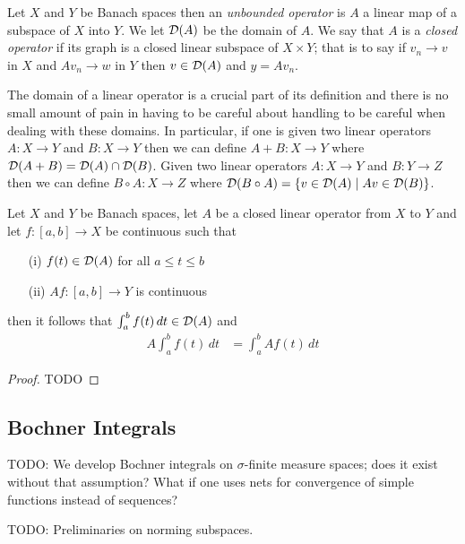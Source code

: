 \begin{defn}Let $X$ and $Y$ be Banach spaces then an \emph{unbounded
    operator} is $A$ a linear
  map of a subspace of $X$ into $Y$.  We let $\mathcal{D}(A)$ be the
  domain of $A$.  We say that $A$ is a \emph{closed
  operator} if its graph is a closed linear subspace of $X \times Y$;
  that is to say if $v_n \to v$ in $X$ and $A v_n \to w$  in $Y$ then
  $v \in \mathcal{D}(A)$ and $y = A v_n$.
\end{defn}

The domain of a linear operator is a crucial part of its definition
and there is no small amount of pain in having to be careful about
handling to be careful when dealing with these domains.  In
particular, if one is given two linear operators $A : X \to Y$ and $B
: X \to Y$ then we
can define $A+B : X \to Y$ where $\mathcal{D}(A+B) = \mathcal{D}(A) \cap
\mathcal{D}(B)$.  
Given two linear operators $A : X \to Y$ and $B
: Y \to Z$ then we
can define $B \circ A: X \to Z$ where $\mathcal{D}(B \circ A) = \lbrace v
\in \mathcal{D}(A) \mid Av \in \mathcal{D}(B) \rbrace$.

\begin{prop}\label{ClosedOperatorOfRiemannIntegral}Let $X$ and $Y$ be
  Banach spaces, let $A$ be a closed linear operator from $X$ to $Y$ and
  let $f : [a,b] \to X$ be continuous such that
\begin{itemize}
\item[(i)] $f(t) \in \mathcal{D}(A)$ for all $a \leq t \leq b$
\item[(ii)] $Af : [a,b] \to Y$ is continuous
\end{itemize}
then it follows that $\int_a^b f(t) \, dt \in \mathcal{D}(A)$ and
\begin{align*}
A \int_a^b f(t) \, dt &= \int_a^b A f(t) \, dt
\end{align*}
\end{prop}
\begin{proof}

TODO
\end{proof}

\subsection{Bochner Integrals}

TODO: We develop Bochner integrals on $\sigma$-finite measure spaces;
does it exist without that assumption?  What if one uses nets for
convergence of simple functions instead of sequences?

TODO: Preliminaries on norming subspaces.

